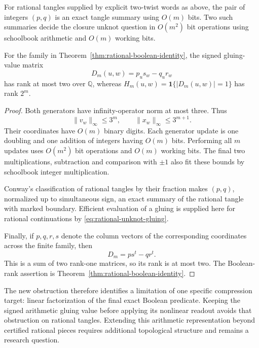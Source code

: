 \begin{theorem}
\label{thm:rational-arithmetic-representation}
For rational tangles supplied by explicit two-twist words as above,
the pair of integers $(p,q)$ is an exact tangle summary using $O(m)$ bits.
Two such summaries decide the closure unknot question in $O(m^2)$ bit
operations using schoolbook arithmetic and $O(m)$ working bits.

For the family in Theorem~\ref{thm:rational-boolean-identity}, the signed
gluing-value matrix
\[
 D_m(u,w)=p_u s_w-q_u r_w
\]
has rank at most two over $\mathbb Q$, whereas
$H_m(u,w)=\mathbf1\{|D_m(u,w)|=1\}$ has rank $2^m$.
\end{theorem}

\begin{proof}
Both generators have infinity-operator norm at most three.  Thus
\[
 \|v_w\|_\infty\le3^m,\qquad
 \|x_w\|_\infty\le3^{m+1}.
\]
Their coordinates have $O(m)$ binary digits.  Each generator update is one
doubling and one addition of integers having $O(m)$ bits.  Performing all
$m$ updates uses $O(m^2)$ bit operations and $O(m)$ working bits.
The final two multiplications, subtraction and comparison with $\pm1$
also fit these bounds by schoolbook integer multiplication.

Conway's classification of rational tangles by their fraction
\cite[Theorem~1]{kauffman-lambropoulou-tangles} makes $(p,q)$, normalized up
to simultaneous sign, an exact summary of the rational tangle with marked
boundary.  Efficient evaluation of a gluing is supplied here for rational
continuations by \eqref{eq:rational-unknot-gluing}.

Finally, if $p,q,r,s$ denote the column vectors of the corresponding
coordinates across the finite family, then
\[
 D_m=ps^t-qr^t.
\]
This is a sum of two rank-one matrices, so its rank is at most two.
The Boolean-rank assertion is Theorem~\ref{thm:rational-boolean-identity}.
\end{proof}

The new obstruction therefore identifies a limitation of one specific
compression target: linear factorization of the final exact Boolean
predicate.  Keeping the signed arithmetic gluing value before applying
its nonlinear readout avoids that obstruction on rational tangles.
Extending this arithmetic representation beyond certified rational pieces
requires additional topological structure and remains a research question.
